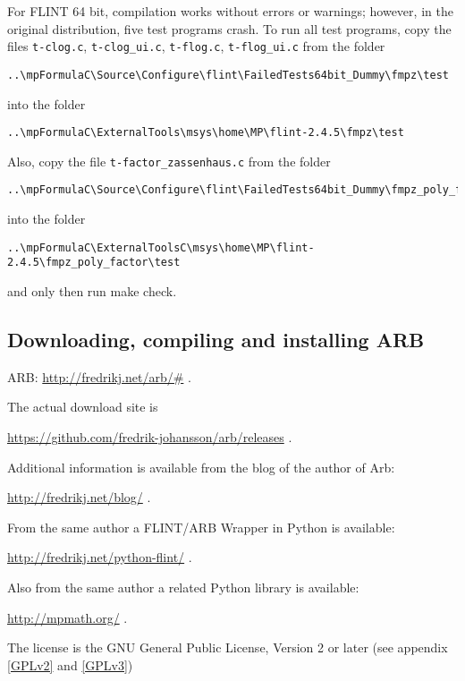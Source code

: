 \vpara
For FLINT 64 bit, compilation works without errors or warnings; however, in the original distribution, five test programs crash. 
To run all test  programs, copy the files \verb|t-clog.c|, \verb|t-clog_ui.c|, \verb|t-flog.c|,  \verb|t-flog_ui.c| from the folder
\begin{verbatim}
..\mpFormulaC\Source\Configure\flint\FailedTests64bit_Dummy\fmpz\test
\end{verbatim}
into the folder
\begin{verbatim}
..\mpFormulaC\ExternalTools\msys\home\MP\flint-2.4.5\fmpz\test
\end{verbatim}
Also, copy the file  \verb|t-factor_zassenhaus.c| from the folder
\begin{verbatim}
..\mpFormulaC\Source\Configure\flint\FailedTests64bit_Dummy\fmpz_poly_factor\test
\end{verbatim}
into the folder
\begin{verbatim}
..\mpFormulaC\ExternalToolsC\msys\home\MP\flint-2.4.5\fmpz_poly_factor\test
\end{verbatim}

and only then run make check.



\newpage
\subsection{Downloading, compiling and installing ARB}

ARB: \href{http://fredrikj.net/arb/#}{http://fredrikj.net/arb/\#} . 

\vpara
The actual download site is

\href{https://github.com/fredrik-johansson/arb/releases}{https://github.com/fredrik-johansson/arb/releases} . 

\vpara
Additional information is available from the blog of the author of Arb:

\href{http://fredrikj.net/blog/}{http://fredrikj.net/blog/} . 


\vpara
From the same author a FLINT/ARB Wrapper in  Python is available:

\href{http://fredrikj.net/python-flint/}{http://fredrikj.net/python-flint/} . 


\vpara
Also from the same author a related Python library is available:

\href{http://mpmath.org/}{http://mpmath.org/} . 


\vpara
The license is the GNU General Public License, Version 2 or later (see appendix \ref{GPLv2} and \ref{GPLv3})

